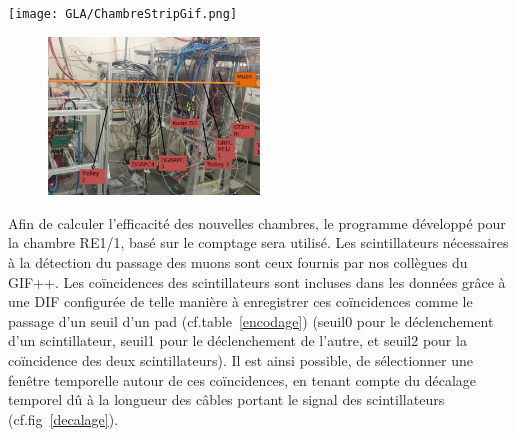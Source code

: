 \marginpar
{
	\centering
	\texttt{[image: GLA/ChambreStripGif.png]}
	\label{nouvellestrip}
}
\vspace*{-0.2cm}
\begin{figure}[ht!]
	\centering
	\includegraphics[width=0.50\textwidth]{GLA/setup.png}
	\label{bati}
\end{figure}
\vspace*{-0.2cm}
Afin de calculer l'efficacité des nouvelles chambres, le programme développé pour la chambre RE1/1, basé sur le comptage sera utilisé. Les scintillateurs nécessaires à la détection du passage des muons sont ceux fournis par nos collègues du GIF++. Les coïncidences des scintillateurs sont incluses dans les données grâce à une DIF configurée de telle manière à enregistrer ces coïncidences comme le passage d'un seuil d'un pad (cf.table~\ref{encodage}) (seuil0 pour le déclenchement d'un scintillateur, seuil1 pour le déclenchement de l'autre, et seuil2 pour la coïncidence des deux scintillateurs). Il est ainsi possible, de sélectionner une fenêtre temporelle autour de ces coïncidences, en tenant compte du décalage temporel dû à la longueur des câbles portant le signal des scintillateurs (cf.fig~\ref{decalage}). 

